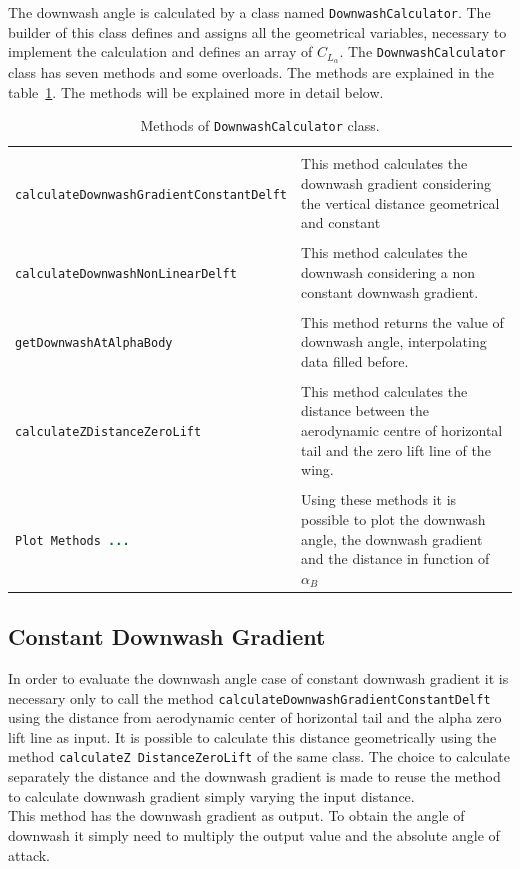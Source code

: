 The downwash angle is calculated by a class named \texttt{DownwashCalculator}. The builder of this class defines and assigns all the geometrical variables, necessary to implement the calculation and defines an array of $C_{L_{\alpha}}$. The  \texttt{DownwashCalculator} class has seven methods and some overloads. The methods are explained in the table~\ref{table:Table1}. The methods will be explained more in detail below.

\begin{table}[H]
\begin{tabular}{p{7cm}p{7.5cm}}
\toprule
 \\[0.1	cm] 
\lstinline[language=Java]!calculateDownwashGradientConstantDelft! & This method calculates the downwash gradient  considering the vertical distance geometrical and constant\\ \hline \\[0.1	cm] 
\lstinline[language=Java]!calculateDownwashNonLinearDelft! &This method calculates the downwash considering a non constant downwash gradient.  \\ \hline \\ [0.1cm]
\lstinline[language=Java]!getDownwashAtAlphaBody! & This method returns the value of downwash angle, interpolating data filled before.\\ \hline \\[0.1cm]
\lstinline[language=Java]!calculateZDistanceZeroLift!	& This method calculates the distance between the aerodynamic centre of horizontal tail and the zero lift line of the wing. \\ \hline \\[0.1cm]
\lstinline[language=Java]!Plot Methods ...! & Using these methods it is possible to plot the downwash angle, the downwash gradient and the distance in function of $\alpha_{B}$ \\
\bottomrule
\end{tabular}
\caption{Methods of \texttt{DownwashCalculator} class.}
\label{table:Table1}
\end{table}


\subsection{Constant Downwash Gradient}
In order to evaluate the downwash angle case of constant downwash gradient it is necessary only to call the method \texttt{calculateDownwashGradientConstantDelft} using the distance from aerodynamic center of horizontal tail and the alpha zero lift line as input. It is possible to calculate this distance geometrically using the method \texttt{calculateZ DistanceZeroLift} of the same class. The choice to calculate separately the distance and the downwash gradient is made to reuse the method to calculate downwash gradient simply varying the input distance. \\ 
This method has the downwash gradient as output. To obtain the angle of downwash it simply need to multiply the output value and the absolute angle of attack. 

